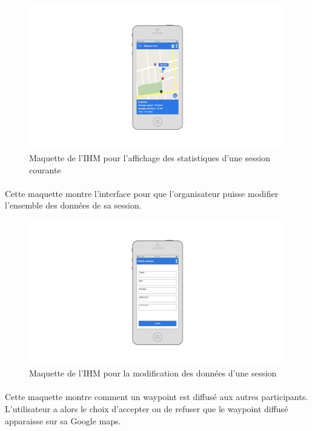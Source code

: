 \documentclass[titlepage, 12pt]{report}
\begin{document}
\begin{figure}[!h]
	\caption{Maquette de l'IHM pour l'affichage des statistiques d'une session courante}
	\label{statistics_view}
	\centering
	\includegraphics[scale=0.3]{images/mockups/statistics.png}
\end{figure}

\clearpage

\paragraph{}Cette maquette montre l'interface pour que l'organisateur puisse modifier l'ensemble des données de sa session.

\begin{figure}[!h]
	\caption{Maquette de l'IHM pour la modification des données d'une session}
	\label{modify_session}
	\centering
	\includegraphics[scale=0.3]{images/mockups/modify_session.png}
\end{figure}

\clearpage

\paragraph{}Cette maquette montre comment un waypoint est diffusé aux autres participants. L'utilisateur a alors le choix d'accepter ou de refuser que le waypoint diffusé apparaisse sur sa Google maps.
\end{document}
